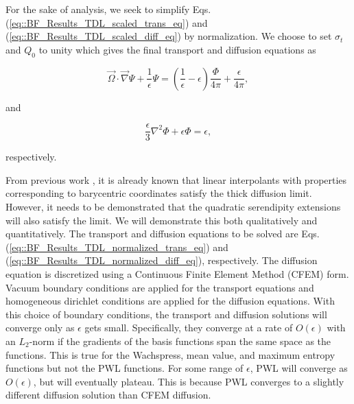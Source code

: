 For the sake of analysis, we seek to simplify Eqs. (\ref{eq::BF_Results_TDL_scaled_trans_eq}) and (\ref{eq::BF_Results_TDL_scaled_diff_eq}) by normalization. We choose to set $\sigma_t$ and $Q_0$ to unity which gives the final transport and diffusion equations as  

\begin{equation}
\label{eq::BF_Results_TDL_normalized_trans_eq}
\vec{\Omega} \cdot \vec{\nabla} \Psi + \frac{1}{\epsilon} \Psi =  \left( \frac{1}{\epsilon} - \epsilon   \right)  \frac{\Phi}{4 \pi} +  \frac{\epsilon}{4 \pi} ,
\end{equation}

\noindent and

\begin{equation}
\label{eq::BF_Results_TDL_normalized_diff_eq}
\frac{\epsilon}{3} {\nabla}^2 \Phi + \epsilon  \Phi =  \epsilon ,
\end{equation}

\noindent respectively.

From previous work \cite{adams2001dfem}, it is already known that linear interpolants with properties corresponding to barycentric coordinates satisfy the thick diffusion limit. However, it needs to be demonstrated that the quadratic serendipity extensions will also satisfy the limit. We will demonstrate this both qualitatively and quantitatively. The transport and diffusion equations to be solved are Eqs. (\ref{eq::BF_Results_TDL_normalized_trans_eq}) and (\ref{eq::BF_Results_TDL_normalized_diff_eq}), respectively. The diffusion equation is discretized using a Continuous Finite Element Method (CFEM) form. Vacuum boundary conditions are applied for the transport equations and homogeneous dirichlet conditions are applied for the diffusion equations. With this choice of boundary conditions, the transport and diffusion solutions will converge only as $\epsilon$ gets small. Specifically, they converge at a rate of $O(\epsilon)$ with an $L_2$-norm if the gradients of the basis functions span the same space as the functions. This is true for the Wachspress, mean value, and maximum entropy functions but not the PWL functions. For some range of $\epsilon$, PWL will converge as $O(\epsilon)$, but will eventually plateau. This is because PWL converges to a slightly different diffusion solution than CFEM diffusion.

